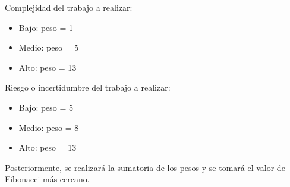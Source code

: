 \documentclass[
11pt, %
]{charter}
\begin{document}
Complejidad del trabajo a realizar:
\begin{itemize}
    \item Bajo: peso = 1
    \item Medio: peso = 5
    \item Alto: peso = 13
\end{itemize}

Riesgo o incertidumbre del trabajo a realizar:
\begin{itemize}
    \item Bajo: peso = 5
    \item Medio: peso = 8
    \item Alto: peso = 13
\end{itemize}

Posteriormente, se realizará la sumatoria de los pesos y se tomará el valor de Fibonacci más cercano.
\end{document}
